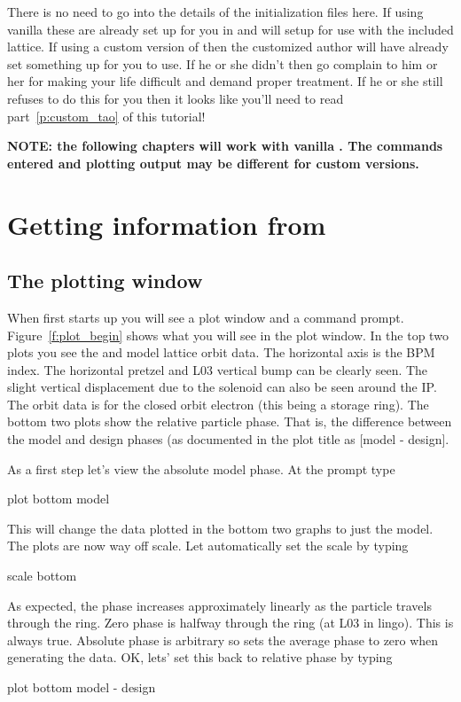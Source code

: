\documentclass{report}
\begin{document}
There is no need to go into the details of the initialization files here. If
using vanilla \tao these are already set up for you in  and will
setup \tao for use with the included \cesr lattice. If
using a custom version of \tao then the customized \tao author will have already set something
up for you to use. If he or she didn't then go complain to him or her for making
your life difficult and demand proper treatment. If he or she still refuses to
do this for you then it looks like you'll need to read part~\ref{p:custom_tao}
of this tutorial!

\textbf{NOTE: the following chapters will work with vanilla \tao. The commands
entered and plotting output may be different for custom versions.}


\chapter{Getting information from \tao}
\label{c:get_info}

\section{The plotting window}

When \tao first starts up you will see a plot window and a command prompt. 
Figure~\ref{f:plot_begin} shows what you will see in the plot window. In the top
two plots you see the  and  model lattice orbit data. The horizontal
axis is the \cesr BPM index. The horizontal pretzel and L03 vertical bump can be clearly 
seen. The slight vertical displacement due to the solenoid can also be seen around 
the IP. The orbit data is for the closed orbit electron (this being a storage
ring). The bottom two plots show the relative 
particle phase. That is, the difference
between the model and design phases (as documented in the plot title as [model -
design]. 

As a first step let's view the absolute model phase. At the  prompt type
\begin{example}
  plot bottom model
\end{example}
This will change the data plotted in the bottom two graphs to just the model.
The plots are now way off scale. Let \tao automatically set the scale by typing
\begin{example}
  scale bottom
\end{example}
As expected, the phase increases approximately linearly as the particle travels
through the ring. Zero phase is halfway through the ring (at L03 in \cesr lingo).
This is always true. Absolute phase is arbitrary so \tao sets the average
phase to zero when generating the data. OK, lets' set this back to relative
phase by typing
\begin{example}
  plot bottom model - design
\end{example}
\end{document}

